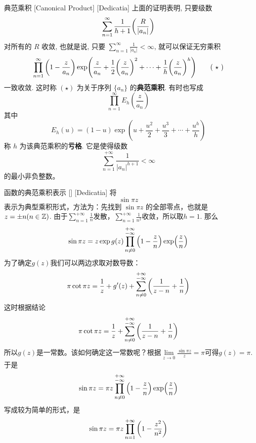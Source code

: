         \begin{dfn}
            {典范乘积}
            [Canonical Product]
            [Dedicatia]
            上面的证明表明, 只要级数
            \[\sum_{n=1}^{\infty}\frac{1}{h+1}\qty(\frac{R}{|a_n|})\]
            对所有的 \(R\) 收敛, 也就是说, 只要 \(\sum\limits_{n=1}^{\infty}\frac{1}{|a_n|}<\infty\), 就可以保证无穷乘积
            \[\prod_{n=1}^{\infty}\qty(1-\frac{z}{a_n})\exp(\frac{z}{a_n}+\frac{1}{2}\qty(\frac{z}{a_n})^2+\cdots+\frac{1}{h}\qty(\frac{z}{a_n})^{h})\tag{ \(\star\) }\]
            一致收敛. 这时称 \((\star)\) 为关于序列 \(\{a_n\}\) 的\textbf{典范乘积}. 有时也写成
            \[\prod_{n=1}^{\infty}E_h(\frac{z}{a_n})\]
            其中
            \[E_h(u)=(1-u)\exp(u+\frac{u^2}{2}+\frac{u^3}{3}+\cdots+\frac{u^h}{h})\]
            称 \(h\) 为该典范乘积的\textbf{亏格}. 它是使得级数
            \[\sum_{n=1}^{+\infty}\frac{1}{|a_n|^{h+1}}<\infty\]
            的最小非负整数。
        \end{dfn}

        \begin{xmp}
            {函数的典范乘积表示}
            []
            [Dedicatia]
            将
            \[\sin \pi z\]
            表示为典型乘积形式，方法为：先找到 \(\sin\pi z\) 的全部零点，也就是 \(z=\pm n(n\in\operatorname{\mathbb{Z}})\). 由于$\sum_{n=1}^{+\infty}\frac{1}{n}$发散，$\sum_{n=1}^{+\infty}\frac{1}{n^2}$收敛，所以取$h=1$. 那么
            \[\sin\pi z=z\exp g(z)\prod_{n\neq 0}^{\substack{+\infty\\ -\infty}}\qty(1-\frac{z}{n})\exp(\frac{z}{n})\]
            为了确定$g(z)$我们可以两边求取对数导数：
            \[\pi\cot\pi z=\frac{1}{z}+g'(z)+\sum_{n\neq 0}^{\substack{+\infty\\ -\infty}}\qty(\frac{1}{z-n}+\frac{1}{n})\]
            这时根据结论
            \[\pi\cot\pi z=\frac{1}{z}+\sum_{n\neq 0}^{\substack{+\infty\\ -\infty}}\qty(\frac{1}{z-n}+\frac{1}{n})\]
            所以$g(z)$是一常数。该如何确定这一常数呢？根据$\lim\limits_{z\to 0}\frac{\sin\pi z}{z}=\pi$可得$g(z)=\pi$. 于是
            \[\sin\pi z=\pi z\prod_{n\neq 0}^{\substack{+\infty\\ -\infty}}\qty(1-\frac{z}{n})\exp(\frac{z}{n})\]
            写成较为简单的形式，是
            \[\sin\pi z=\pi z\prod_{n=1}^{+\infty}\qty(1-\frac{z^2}{n^2})\]
        \end{xmp}


